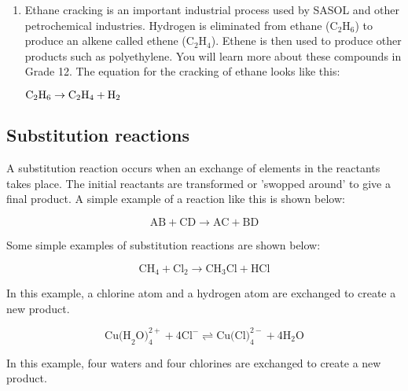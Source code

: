 \begin{enumerate}
{}

\item{Ethane cracking is an important industrial process used by SASOL and other petrochemical industries. Hydrogen is eliminated from ethane (C$_{2}$H$_{6}$) to produce an alkene called ethene (C$_{2}$H$_{4}$). Ethene is then used to produce other products such as polyethylene. You will learn more about these compounds in Grade 12. The equation for the cracking of ethane looks like this:

\begin{center}
$\rm{C_{2}H_{6} \rightarrow C_{2}H_{4} + H_{2}}$
\end{center}
}

\end{enumerate}

\subsection{Substitution reactions}

A substitution reaction occurs when an exchange of elements in the reactants takes place. The initial reactants are transformed or 'swopped around' to give a final product. A simple example of a reaction like this is shown below:

\begin{equation*}
\text{AB} + \text{CD} \rightarrow \text{AC} + \text{BD}
\end{equation*}

Some simple examples of substitution reactions are shown below:

\begin{equation*}
\text{CH}_{4} + \text{Cl}_{2} \rightarrow \text{CH}_{3}\text{Cl} + \text{HCl}
\end{equation*}

In this example, a chlorine atom and a hydrogen atom are exchanged to create a new product.

\begin{equation*}
\text{Cu(H}_{2}\text{O)}_{4}^{2+} + 4\text{Cl}^{-} \rightleftharpoons \text{Cu(Cl)}_{4}^{2-} + 4\text{H}_{2}\text{O}
\end{equation*}

In this example, four waters and four chlorines are exchanged to create a new product.

